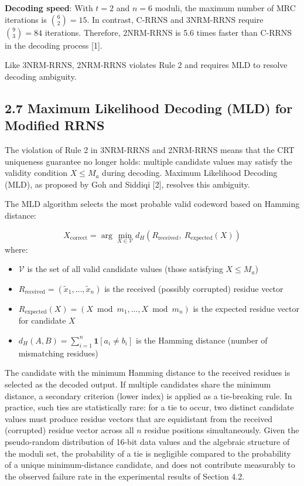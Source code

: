 \textbf{Decoding speed}: With \(t = 2\) and \(n = 6\) moduli, the
maximum number of MRC iterations is \(\binom{6}{2} = 15\). In contrast,
C-RRNS and 3NRM-RRNS require \(\binom{9}{3} = 84\) iterations.
Therefore, 2NRM-RRNS is 5.6 times faster than C-RRNS in the decoding
process {[}1{]}.

Like 3NRM-RRNS, 2NRM-RRNS violates Rule 2 and requires MLD to resolve
decoding ambiguity.

\subsection{2.7 Maximum Likelihood Decoding (MLD) for Modified
RRNS}\label{maximum-likelihood-decoding-mld-for-modified-rrns}

The violation of Rule 2 in 3NRM-RRNS and 2NRM-RRNS means that the CRT
uniqueness guarantee no longer holds: multiple candidate values may
satisfy the validity condition \(X \leq M_a\) during decoding. Maximum
Likelihood Decoding (MLD), as proposed by Goh and Siddiqi {[}2{]},
resolves this ambiguity.

The MLD algorithm selects the most probable valid codeword based on
Hamming distance:

\[X_{\text{correct}} = \arg\min_{X \in \mathcal{V}} d_H\!\left(R_{\text{received}},\ R_{\text{expected}}(X)\right)\]
where:

\begin{itemize}
\tightlist
\item
  \(\mathcal{V}\) is the set of all valid candidate values (those
  satisfying \(X \leq M_a\))
\item
  \(R_{\text{received}} = (\tilde{x}_1, \ldots, \tilde{x}_n)\) is the
  received (possibly corrupted) residue vector
\item
  \(R_{\text{expected}}(X) = (X \bmod m_1, \ldots, X \bmod m_n)\) is the
  expected residue vector for candidate \(X\)
\item
  \(d_H(A, B) = \sum_{i=1}^{n} \mathbf{1}[a_i \neq b_i]\) is the Hamming
  distance (number of mismatching residues)
\end{itemize}

The candidate with the minimum Hamming distance to the received residues
is selected as the decoded output. If multiple candidates share the
minimum distance, a secondary criterion (lower index) is applied as a
tie-breaking rule. In practice, such ties are statistically rare: for a
tie to occur, two distinct candidate values must produce residue vectors
that are equidistant from the received (corrupted) residue vector across
all \(n\) residue positions simultaneously. Given the pseudo-random
distribution of 16-bit data values and the algebraic structure of the
moduli set, the probability of a tie is negligible compared to the
probability of a unique minimum-distance candidate, and does not
contribute measurably to the observed failure rate in the experimental
results of Section 4.2.

